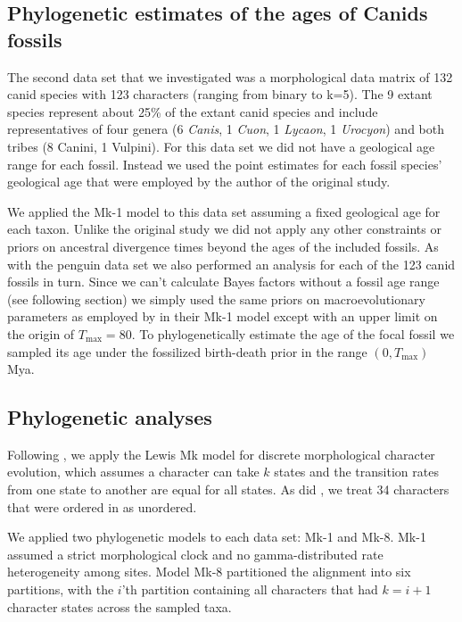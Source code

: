 \documentclass[11pt]{article}
\newcommand{\Mstrict}{{Mk-1}}
\begin{document}
\subsection*{Phylogenetic estimates of the ages of Canids fossils}

The second data set that we investigated was a morphological data matrix of 132 canid species \cite[9 extant and 123 fossil;][]{Slater2015} with 123 characters (ranging from binary to k=5). 
The 9 extant species represent about 25\% of the extant canid species and include representatives of four genera (6 {\em Canis}, 1 {\em Cuon}, 1 {\em Lycaon}, 1 {\em Urocyon}) and both tribes (8 Canini, 1 Vulpini). 
For this data set we did not have a geological age range for each fossil. Instead we used the point estimates for each fossil species' geological age that were employed by the author of the original study.

We applied the \Mstrict{} model to this data set assuming a fixed geological age for each taxon. Unlike the original study \cite{Slater2015} we did not apply any other constraints or priors on ancestral divergence times beyond the ages of the included fossils. 
As with the penguin data set we also performed an analysis for each of the 123 canid fossils in turn. Since we can't calculate Bayes factors without a fossil age range (see following section) we simply used the same priors on macroevolutionary parameters as employed by \cite{gavryushkina2015bayesian} in their \Mstrict{} model except with an upper limit on the origin of $T_\text{max} = 80$. To phylogenetically estimate the age of the focal fossil we sampled its age under the fossilized birth-death prior in the range $(0,T_\text{max})$ Mya.

\subsection*{Phylogenetic analyses}

Following \cite{gavryushkina2015bayesian}, we apply the Lewis Mk model 
\citep{Lewis2001} for discrete morphological character evolution, which assumes a character can take $k$ states and the transition rates from one state to another are equal for all states. As did \cite{gavryushkina2015bayesian}, we treat 34 characters that were ordered in \citep{ksepka2012} as unordered. 

We applied two phylogenetic models to each data set: Mk-1 and Mk-8. Mk-1 assumed a strict morphological clock and no gamma-distributed rate heterogeneity among sites. Model Mk-8 partitioned the alignment into six partitions, with the $i$'th partition containing all characters that had $k=i+1$ character states across the sampled taxa.
\end{document}
